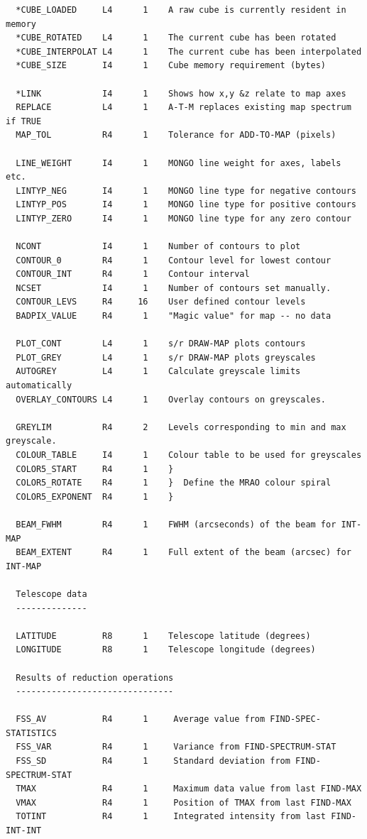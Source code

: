 \documentclass[11pt,twoside]{report}
\begin{document}
\begin{verbatim}
  *CUBE_LOADED     L4      1    A raw cube is currently resident in memory
  *CUBE_ROTATED    L4      1    The current cube has been rotated
  *CUBE_INTERPOLAT L4      1    The current cube has been interpolated
  *CUBE_SIZE       I4      1    Cube memory requirement (bytes)

  *LINK            I4      1    Shows how x,y &z relate to map axes
  REPLACE          L4      1    A-T-M replaces existing map spectrum if TRUE
  MAP_TOL          R4      1    Tolerance for ADD-TO-MAP (pixels)

  LINE_WEIGHT      I4      1    MONGO line weight for axes, labels etc.
  LINTYP_NEG       I4      1    MONGO line type for negative contours
  LINTYP_POS       I4      1    MONGO line type for positive contours
  LINTYP_ZERO      I4      1    MONGO line type for any zero contour

  NCONT            I4      1    Number of contours to plot
  CONTOUR_0        R4      1    Contour level for lowest contour
  CONTOUR_INT      R4      1    Contour interval
  NCSET            I4      1    Number of contours set manually.
  CONTOUR_LEVS     R4     16    User defined contour levels
  BADPIX_VALUE     R4      1    "Magic value" for map -- no data

  PLOT_CONT        L4      1    s/r DRAW-MAP plots contours
  PLOT_GREY        L4      1    s/r DRAW-MAP plots greyscales
  AUTOGREY         L4      1    Calculate greyscale limits automatically
  OVERLAY_CONTOURS L4      1    Overlay contours on greyscales.

  GREYLIM          R4      2    Levels corresponding to min and max greyscale.
  COLOUR_TABLE     I4      1    Colour table to be used for greyscales
  COLOR5_START     R4      1    }
  COLOR5_ROTATE    R4      1    }  Define the MRAO colour spiral
  COLOR5_EXPONENT  R4      1    }
 
  BEAM_FWHM        R4      1    FWHM (arcseconds) of the beam for INT-MAP
  BEAM_EXTENT      R4      1    Full extent of the beam (arcsec) for INT-MAP

  Telescope data
  --------------

  LATITUDE         R8      1    Telescope latitude (degrees)
  LONGITUDE        R8      1    Telescope longitude (degrees)

  Results of reduction operations
  -------------------------------

  FSS_AV           R4      1     Average value from FIND-SPEC-STATISTICS
  FSS_VAR          R4      1     Variance from FIND-SPECTRUM-STAT
  FSS_SD           R4      1     Standard deviation from FIND-SPECTRUM-STAT
  TMAX             R4      1     Maximum data value from last FIND-MAX
  VMAX             R4      1     Position of TMAX from last FIND-MAX
  TOTINT           R4      1     Integrated intensity from last FIND-INT-INT


\end{verbatim}
\end{document}
